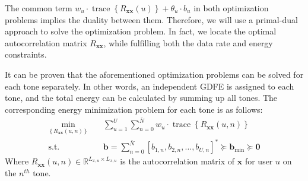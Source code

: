 The common term $w_u \cdot \operatorname{trace}\left\{R_{\boldsymbol{x} \boldsymbol{x}}(u)\right\} + \theta_u \cdot b_u$ in both optimization problems implies the duality between them. Therefore, we will use a primal-dual approach to solve the optimization problem. In fact, we locate the optimal autocorrelation matrix $R_{\boldsymbol{xx}}$, while fulfilling both the data rate and energy constraints. 



It can be proven that the aforementioned optimization problems can be solved for each tone separately. In other words, an independent GDFE is assigned to each tone, and the total energy can be calculated by summing up all tones\cite{book}. The corresponding energy minimization problem for each tone is as follows:
\begin{equation} \label{tonalE}
    \begin{aligned}
        \min_{\left\{R_{\boldsymbol{x} \boldsymbol{x}}{(u, n)}\right\}} \quad &\sum_{u=1}^U \sum_{n=0}^{\bar{N}} w_u \cdot \operatorname{trace}\left\{R_{\boldsymbol{x} \boldsymbol{x}}(u, n)\right\} \\
        \textrm{s.t.} \quad &\mathbf{b}=\sum_{n=0}^{\bar{N}}\left[b_{1, n}, b_{2, n}, \ldots ,b_{U, n}\right]^* \succeq \boldsymbol{b}_{\min } \succeq \mathbf{0}
    \end{aligned}
\end{equation}
Where $R_{\boldsymbol{xx}}(u,n)\in\mathbb{R}^{L_{x,u}\times L_{x,u}}$ is the autocorrelation matrix of $\boldsymbol{x}$ for user $u$ on the $n^{th}$ tone. 

